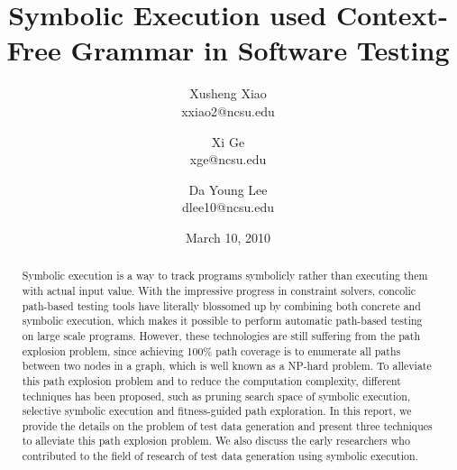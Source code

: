 \documentclass[times, 10pt,onecolumn]{article}
\title{Symbolic Execution used Context-Free Grammar in Software Testing}
\author{
Xusheng Xiao\\
\small{xxiao2@ncsu.edu}\\
\and
Xi Ge\\
\small{xge@ncsu.edu}\\
\and
Da Young Lee\\
\small{dlee10@ncsu.edu}
}
\date{March 10, 2010}
\begin{document}
\maketitle
\thispagestyle{empty}
\pagestyle{empty}

\begin{abstract}
Symbolic execution is a way to track programs symbolicly rather than executing them with actual input value. With the impressive progress in constraint solvers, concolic path-based testing tools have literally blossomed up by combining both concrete and symbolic execution, which makes it possible to perform automatic path-based testing on large scale programs. However, these technologies are still suffering from the path explosion problem, since achieving 100\% path coverage is to enumerate all paths between two nodes in a graph, which is well known as a NP-hard problem. To alleviate this path explosion problem and to reduce the computation complexity, different techniques has been proposed, such as pruning search space of symbolic execution, selective symbolic execution and fitness-guided path exploration. In this report, we provide the details on the problem of test data generation and present three techniques to alleviate this path explosion problem. We also discuss the early researchers who contributed to the field of research of test data generation using symbolic execution. \end{abstract}













\end{document}
